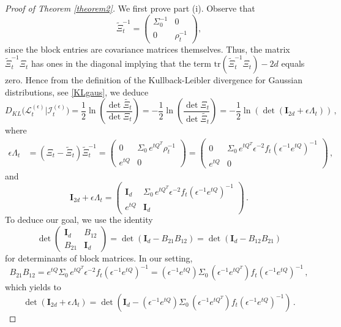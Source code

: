 \documentclass[12pt,thmsa]{article}
\begin{document}
\begin{proof}[Proof of Theorem \ref{theorem2}] 
	
	We first prove part (i). Observe that
	$$ 
	\widetilde{\Xi}_t ^{-1}=  
	\begin{pmatrix} 
		\Sigma_0^{-1} & 0 \\ 
		0 & \rho_t^{-1} 
	\end{pmatrix}, $$
	since the block entries are covariance matrices themselves. Thus,  the matrix $\widetilde{\Xi}_t^{-1} \Xi_t$ has ones in the diagonal implying that  the term $\mathrm{tr}( \widetilde{\Xi}_t^{-1}\Xi_t )- 2d$ equals zero. Hence from the definition of the Kullback-Leibler divergence for Gaussian distributions, see \eqref{KLgaus}, we deduce
	\[
	D_{KL}\Big( \mathcal{L}^{(\epsilon)}_t  \Big| \mathcal{I}^{(\epsilon)}_t  \Big) = \frac{1}{2} \ln \left( \frac{\det  \widetilde{\Xi_t} }{\det \Xi_t } \right)=-\frac{1}{2}\ln\left( \frac{\det \Xi_t }{\det  \widetilde{\Xi_t} } \right)=-\frac{1}{2}\ln\left(\det ( \mathbf{I}_{2d}+ \epsilon \Lambda_t)\right)\,,
	\]
	where
	\[
	\begin{split}
		\epsilon \Lambda_t &= \left(\Xi_t - \widetilde{\Xi}_t\right)  \widetilde{\Xi}_t^{-1} = \begin{pmatrix} 0 & \Sigma_0\, e^{t Q^{T} }   \rho_t^{-1}  \\ e^{t Q }   & 0 \end{pmatrix}= \begin{pmatrix} 0 & \Sigma_0\, e^{t Q^{T} }  \epsilon^{-2}  f_t \left( \epsilon^{-1} e^{tQ}  \right)^{-1}  \\
			e^{tQ} &  0 \end{pmatrix}\, , 
	\end{split}
	\]
	and 
	$$ \mathbf{I}_{2d}+ \epsilon \Lambda_t= \begin{pmatrix}\mathbf{I}_{d} & \Sigma_0\, e^{t Q^{T} }  \epsilon^{-2}  f_t \left( \epsilon^{-1} e^{tQ}  \right)^{-1}  \\ e^{tQ}  & \mathbf{I}_{d} \end{pmatrix}\,.$$
	To deduce our goal, we use the identity 
	\begin{equation}\label{blockdet}
		\det\begin{pmatrix} \mathbf{I}_d & B_{12}\\ B_{21}& \mathbf{I}_d\end{pmatrix}=\det\left( \mathbf{I}_d-B_{21}B_{12}\right)=\det\left( \mathbf{I}_d-B_{12}B_{21}\right)
	\end{equation}
	for determinants of block matrices. In our setting,  
	$$B_{21}B_{12}=e^{tQ}\Sigma_0\, e^{t Q^{T} }  \epsilon^{-2}  f_t \left( \epsilon^{-1} e^{tQ}  \right)^{-1} = \left(\epsilon^{-1}e^{tQ}\right)\Sigma_0\, \left(\epsilon^{-1}e^{t Q^{T} }\right)  f_t \left( \epsilon^{-1} e^{tQ}  \right)^{-1}\,,$$
	which yields to 
	\begin{equation}\label{conv}
		\det\left(\mathbf{I}_{2d}+\epsilon \Lambda_t \right)=\det\left(\mathbf{I}_d- \left(\epsilon^{-1}e^{tQ}\right)\Sigma_0\, \left(\epsilon^{-1}e^{t Q^{T} }\right)  f_t \left( \epsilon^{-1} e^{tQ}  \right)^{-1}\right)\,.
	\end{equation}	
	

\end{proof}
\end{document}
